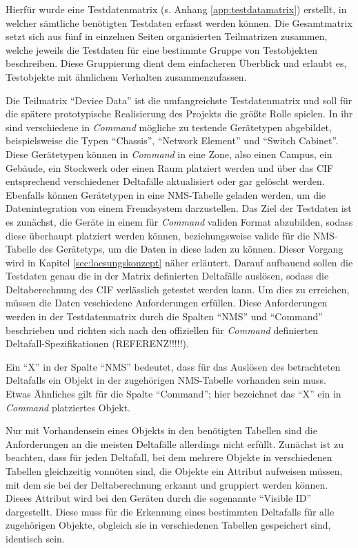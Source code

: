 Hierfür wurde eine Testdatenmatrix (s. Anhang \ref{app:testdatamatrix}) erstellt, in welcher sämtliche benötigten Testdaten erfasst werden können. Die Gesamtmatrix setzt sich aus fünf in einzelnen Seiten organisierten Teilmatrizen zusammen, welche jeweils die Testdaten für eine bestimmte Gruppe von Testobjekten beschreiben. Diese Gruppierung dient dem einfacheren Überblick und erlaubt es, Testobjekte mit ähnlichem Verhalten zusammenzufassen.

Die Teilmatrix \enquote{Device Data} ist die umfangreichste Testdatenmatrix und soll für die spätere prototypische Realisierung des Projekts die größte Rolle spielen. In ihr sind verschiedene in \textit{Command} mögliche zu testende Gerätetypen abgebildet, beispielsweise die Typen \enquote{Chassis}, \enquote{Network Element} und \enquote{Switch Cabinet}. Diese Gerätetypen können in \textit{Command} in eine Zone, also einen Campus, ein Gebäude, ein Stockwerk oder einen Raum platziert werden und über das \ac{CIF} entsprechend verschiedener Deltafälle aktualisiert oder gar gelöscht werden. Ebenfalls können Gerätetypen in eine \ac{NMS}-Tabelle geladen werden, um die Datenintegration von einem Fremdsystem darzustellen. Das Ziel der Testdaten ist es zunächst, die Geräte in einem für \textit{Command} validen Format abzubilden, sodass diese überhaupt platziert werden können, beziehungsweise valide für die \ac{NMS}-Tabelle des Gerätetyps, um die Daten in diese laden zu können. Dieser Vorgang wird in Kapitel \ref{sec:loesungskonzept} näher erläutert. Darauf aufbauend sollen die Testdaten genau die in der Matrix definierten Deltafälle auslösen, sodass die Deltaberechnung des \ac{CIF} verlässlich getestet werden kann. Um dies zu erreichen, müssen die Daten veschiedene Anforderungen erfüllen. Diese Anforderungen werden in der Testdatenmatrix durch die Spalten \enquote{NMS} und \enquote{Command} beschrieben und richten sich nach den offiziellen für \textit{Command} definierten Deltafall-Spezifikationen (REFERENZ!!!!!).

Ein \enquote{X} in der Spalte \enquote{NMS} bedeutet, dass für das Auslösen des betrachteten Deltafalls ein Objekt in der zugehörigen \ac{NMS}-Tabelle vorhanden sein muss. Etwas Ähnliches gilt für die Spalte \enquote{Command}; hier bezeichnet das \enquote{X} ein in \textit{Command} platziertes Objekt.

Nur mit Vorhandensein eines Objekts in den benötigten Tabellen sind die Anforderungen an die meisten Deltafälle allerdings nicht erfüllt. Zunächst ist zu beachten, dass für jeden Deltafall, bei dem mehrere Objekte in verschiedenen Tabellen gleichzeitig vonnöten sind, die Objekte ein Attribut aufweisen müssen, mit dem sie bei der Deltaberechnung erkannt und gruppiert werden können. Dieses Attribut wird bei den Geräten durch die sogenannte \enquote{Visible ID} dargestellt. Diese muss für die Erkennung eines bestimmten Deltafalls für alle zugehörigen Objekte, obgleich sie in verschiedenen Tabellen gespeichert sind, identisch sein.

